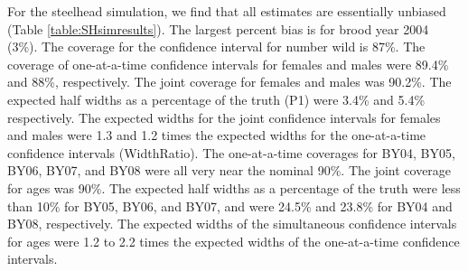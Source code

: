 \documentclass[12pt]{article}
\begin{document}
For the steelhead simulation, we find that all estimates are essentially unbiased (Table \ref{table:SHsimresults}). The largest percent bias is for brood year 2004 (3\%). The coverage for the confidence interval for number wild is 87\%.  The coverage of one-at-a-time confidence intervals for females and males were 89.4\% and 88\%, respectively. The joint coverage for females and males was 90.2\%. The expected half widths as a percentage of the truth (P1) were 3.4\% and 5.4\% respectively.  The expected widths for the joint confidence intervals for females and males were 1.3 and 1.2 times the expected widths for the one-at-a-time confidence intervals (WidthRatio). The one-at-a-time coverages for BY04, BY05, BY06, BY07, and BY08 were all very near the nominal 90\%. The joint coverage for ages was 90\%.  The expected half widths as a percentage of the truth were less than 10\% for BY05, BY06, and BY07, and were 24.5\% and 23.8\% for BY04 and BY08, respectively. The expected widths of the simultaneous confidence intervals for ages were 1.2 to 2.2 times the expected widths of the one-at-a-time confidence intervals.
\end{document}
